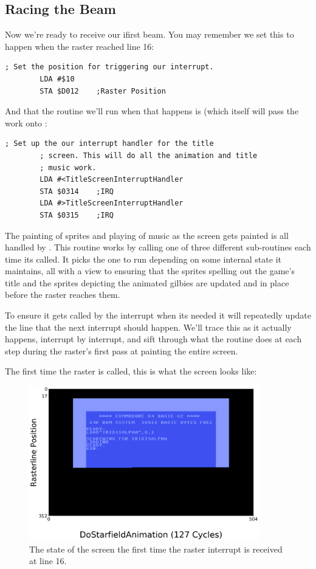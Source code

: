 \subsection{Racing the Beam}
Now we're ready to receive our ifirst beam. You may remember we set this to happen when the raster reached line 16:

\begin{lstlisting}[caption=In \icode{InitializeSpritesAndInterruptsForTitleScreen}]
        ; Set the position for triggering our interrupt.
        LDA #$10
        STA $D012    ;Raster Position
\end{lstlisting}

And that the routine we'll run when that happens is  (which itself will pass
the work onto :

\begin{lstlisting}[caption=In \icode{InitializeSpritesAndInterruptsForTitleScreen}]
        ; Set up the our interrupt handler for the title
        ; screen. This will do all the animation and title
        ; music work.
        LDA #<TitleScreenInterruptHandler
        STA $0314    ;IRQ
        LDA #>TitleScreenInterruptHandler
        STA $0315    ;IRQ
\end{lstlisting}

The painting of sprites and playing of music as the screen gets painted is all handled by .
This routine works by calling one of three different sub-routines each time its called. It picks the one to run
depending on some internal state it maintains, all with a view to ensuring that the sprites spelling out the game's
title and the sprites depicting the animated gilbies are updated and in place before the raster reaches them.

To ensure it gets called by the interrupt when its needed it will repeatedly update the line that the next interrupt
should happen. We'll trace this as it actually happens, interrupt by interrupt, and sift through what the routine
does at each step during the raster's first pass at painting the entire screen.

The first time the raster is called, this is what the screen looks like:

\begin{figure}[H]
    \centering
      \includegraphics[width=10cm]{titlescreen/title1.png}%
\caption{The state of the screen the first time the raster interrupt is received at line 16.}
\end{figure}

